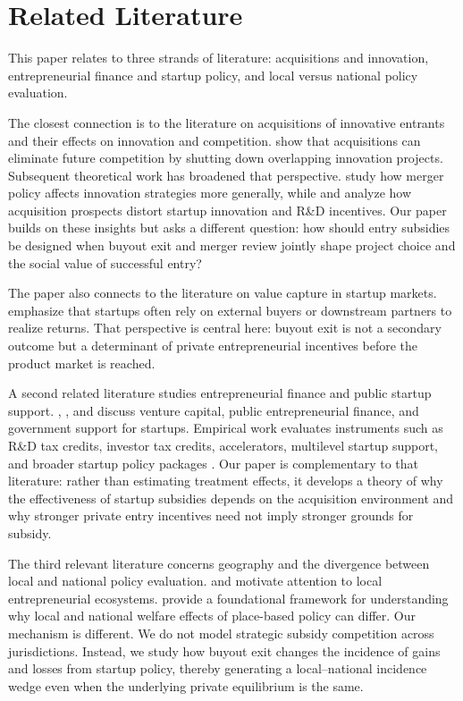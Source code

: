 \section{Related Literature}\label{sec:related}

This paper relates to three strands of literature: acquisitions and innovation, entrepreneurial finance and startup policy, and local versus national policy evaluation.

The closest connection is to the literature on acquisitions of innovative entrants and their effects on innovation and competition. \citet{cunningham2021killer} show that acquisitions can eliminate future competition by shutting down overlapping innovation projects. Subsequent theoretical work has broadened that perspective. \citet{letina2024killer} study how merger policy affects innovation strategies more generally, while \citet{dijk2024direction} and \citet{dijk2025strategic} analyze how acquisition prospects distort startup innovation and R\&D incentives. Our paper builds on these insights but asks a different question: how should entry subsidies be designed when buyout exit and merger review jointly shape project choice and the social value of successful entry?

The paper also connects to the literature on value capture in startup markets. \citet{arora2024missing} emphasize that startups often rely on external buyers or downstream partners to realize returns. That perspective is central here: buyout exit is not a secondary outcome but a determinant of private entrepreneurial incentives before the product market is reached.

A second related literature studies entrepreneurial finance and public startup support. \citet{lerner2020vcrole}, \citet{lerner2022governmentincentives}, and \citet{bai2021public} discuss venture capital, public entrepreneurial finance, and government support for startups. Empirical work evaluates instruments such as R\&D tax credits, investor tax credits, accelerators, multilevel startup support, and broader startup policy packages \citep{fazio2020rdtax,denes2023investortax,gonzalezuribe2018accelerators,lanahan2015multilevel,manaresi2021startupact}. Our paper is complementary to that literature: rather than estimating treatment effects, it develops a theory of why the effectiveness of startup subsidies depends on the acquisition environment and why stronger private entry incentives need not imply stronger grounds for subsidy.

The third relevant literature concerns geography and the divergence between local and national policy evaluation. \citet{chen2010buylocal} and \citet{chatterji2014clusters} motivate attention to local entrepreneurial ecosystems. \citet{kline2013peopleplaces} provide a foundational framework for understanding why local and national welfare effects of place-based policy can differ. Our mechanism is different. We do not model strategic subsidy competition across jurisdictions. Instead, we study how buyout exit changes the incidence of gains and losses from startup policy, thereby generating a local--national incidence wedge even when the underlying private equilibrium is the same.

